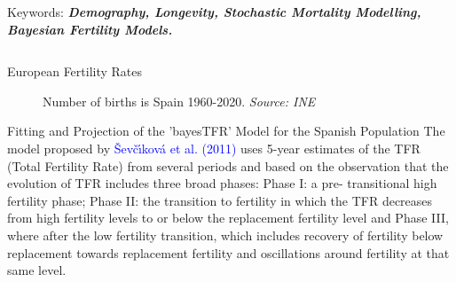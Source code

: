 \documentclass[]{beamer}
\begin{document}
\begin{frame}{\vspace{1ex}\hfill Keywords: \bfseries \textit{Demography, Longevity, Stochastic Mortality Modelling, Bayesian Fertility Models.}}
\begin{columns}[t]
\begin{block}{European Fertility Rates}
\begin{figure}[ht]
				\hfill
				\begin{minipage}[b]{.48\textwidth}
				\centering
				\caption{\small Number of births is Spain 1960-2020. \textit{Source: INE}}
				\end{minipage}
			\end{figure}
					\vspace{-0.5cm}
					\begin{minipage}{.98\columnwidth}
					\begin{block}{Fitting and Projection of the ’bayesTFR’ Model for the Spanish Population}
					The model proposed by \textcolor{blue}{\v{S}ev\v{c}{\'\i}kov\'{a} et al. (2011)} uses 5-year estimates of the TFR (Total Fertility Rate) from several periods and based on the observation that the evolution of  TFR includes three broad phases: Phase I: a pre- transitional high fertility phase; Phase II: the transition to fertility in which the TFR decreases from high fertility levels to or below the replacement fertility level and Phase III, where after the low fertility transition, which includes recovery of fertility below replacement towards replacement fertility and oscillations around fertility at that same level.

\end{block}
\end{minipage}
\end{block}
\end{columns}
\end{frame}
\end{document}
